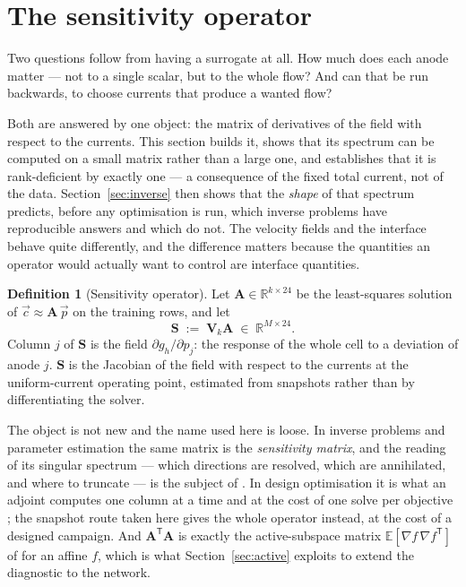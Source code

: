 \documentclass[11pt,a4paper]{article}
\newcommand{\vect}[1]{\mathbf{#1}}
\newcommand{\Real}{\mathbb{R}}
\newcommand{\Exp}{\mathbb{E}}
\theoremstyle{plain}
\theoremstyle{definition}
\newtheorem{definition}[proposition]{Definition}
\theoremstyle{remark}
\begin{document}
\section{The sensitivity operator}
\label{sec:sensitivity}

Two questions follow from having a surrogate at all. How much does each anode
matter --- not to a single scalar, but to the whole flow? And can that be run
backwards, to choose currents that produce a wanted flow?

Both are answered by one object: the matrix of derivatives of the field with
respect to the currents. This section builds it, shows that its spectrum can be
computed on a small matrix rather than a large one, and establishes that it is
rank-deficient by exactly one --- a consequence of the fixed total current, not
of the data. Section~\ref{sec:inverse} then shows that the \emph{shape} of that
spectrum predicts, before any optimisation is run, which inverse problems have
reproducible answers and which do not. The velocity fields and the interface
behave quite differently, and the difference matters because the quantities an
operator would actually want to control are interface quantities.

\begin{definition}[Sensitivity operator]
\label{def:A}
Let $\vect{A} \in \Real^{k\times 24}$ be the least-squares solution of
$\vec{c} \approx \vect{A}\,\vec{p}$ on the training rows, and let
\begin{equation}
\label{eq:S}
\vect{S} \;:=\; \vect{V}_k\vect{A} \;\in\; \Real^{M\times 24}.
\end{equation}
Column $j$ of $\vect{S}$ is the field $\partial g_h/\partial p_j$: the response
of the whole cell to a deviation of anode $j$. $\vect{S}$ is the Jacobian of the
field with respect to the currents at the uniform-current operating point,
estimated from snapshots rather than by differentiating the solver.

The object is not new and the name used here is loose. In inverse problems and
parameter estimation the same matrix is the \emph{sensitivity matrix}, and the
reading of its singular spectrum --- which directions are resolved, which are
annihilated, and where to truncate --- is the subject of
\cite{hansen,engl}. In design optimisation it is what an adjoint computes one
column at a time and at the cost of one solve per objective
\cite{jameson,giles}; the snapshot route taken here gives the whole operator
instead, at the cost of a designed campaign. And
$\vect{A}^{\mathsf{T}}\vect{A}$ is exactly the active-subspace matrix
$\Exp[\nabla f\,\nabla f^{\mathsf{T}}]$ of \cite{constantine-book} for an affine
$f$, which is what Section~\ref{sec:active} exploits to extend the diagnostic to
the network.
\end{definition}
\end{document}
